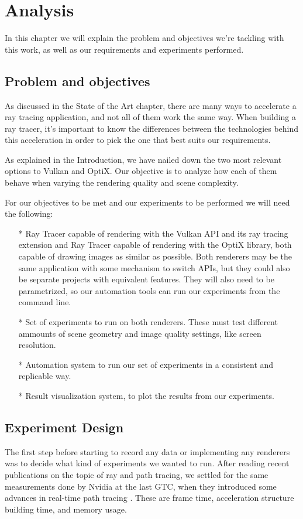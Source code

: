 \chapter{Analysis}
In this chapter we will explain the problem and objectives we're tackling with this work, as well as our requirements and experiments performed.

\section{Problem and objectives}
As discussed in the State of the Art chapter, there are many ways to accelerate a ray tracing application, and not all of them work the same way. When building a ray tracer, it's important to know the differences between the technologies behind this acceleration in order to pick the one that best suits our requirements.

As explained in the Introduction, we have nailed down the two most relevant options to Vulkan and OptiX. Our objective is to analyze how each of them behave when varying the rendering quality and scene complexity.

For our objectives to be met and our experiments to be performed we will need the following:

\begin{itemize}
  \item[*]{Ray Tracer capable of rendering with the Vulkan API and its ray tracing extension and Ray Tracer capable of rendering with the OptiX library, both capable of drawing images as similar as possible. Both renderers may be the same application with some mechanism to switch APIs, but they could also be separate projects with equivalent features. They will also need to be parametrized, so our automation tools can run our experiments from the command line.}
  \item[*]{Set of experiments to run on both renderers. These must test different ammounts of scene geometry and image quality settings, like screen resolution.}
  \item[*]{Automation system to run our set of experiments in a consistent and replicable way.}
  \item[*]{Result visualization system, to plot the results from our experiments.}
\end{itemize}

\section{Experiment Design}
The first step before starting to record any data or implementing any renderers was to decide what kind of experiments we wanted to run. After reading recent publications on the topic of ray and path tracing, we settled for the same measurements done by Nvidia at the last GTC, when they introduced some advances in real-time path tracing \cite{Clarberg2022}. These are frame time, acceleration structure building time, and memory usage.

